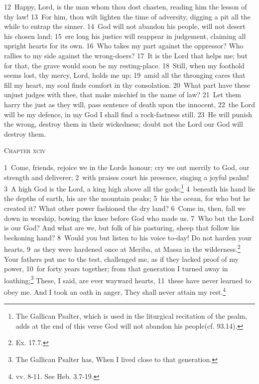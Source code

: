 \documentclass[10pt]{book} %
\begin{document}
\textcolor{benred8}{12}~Happy, Lord, is the man whom thou dost chasten, reading him the lesson of thy law! \textcolor{benred8}{13}~For him, thou wilt lighten the time of adversity, digging a pit all the while to entrap the sinner. \textcolor{benred8}{14}~God will not abandon his people, will not desert his chosen land; \textcolor{benred8}{15}~ere long his justice will reappear in judgement, claiming all upright hearts for its own. \textcolor{benred8}{16}~Who takes my part against the oppressor? Who rallies to my side against the wrong-doers? \textcolor{benred8}{17}~It is the Lord that helps me; but for that, the grave would soon be my resting-place. \textcolor{benred8}{18}~Still, when my foothold seems lost, thy mercy, Lord, holds me up; \textcolor{benred8}{19}~amid all the thronging cares that fill my heart, my soul finds comfort in thy consolation. \textcolor{benred8}{20}~What part have these unjust judges with thee, that make mischief in the name of law? \textcolor{benred8}{21}~Let them harry the just as they will, pass sentence of death upon the innocent, \textcolor{benred8}{22}~the Lord will be my defence, in my God I shall find a rock-fastness still. \textcolor{benred8}{23}~He will punish the wrong, destroy them in their wickedness; doubt not the Lord our God will destroy them.
\begin{large}\begin{center}\textsc{Chapter xciv}\end{center}\end{large}
\textcolor{benred8}{1}~Come, friends, rejoice we in the Lord\textquotesingle s honour; cry we out merrily to God, our strength and deliverer; \textcolor{benred8}{2}~with praises court his presence, singing a joyful psalm! \textcolor{benred8}{3}~A high God is the Lord, a king high above all the gods;\footnote[1]{The Gallican Psalter, which is used in the liturgical recitation of the psalm, adds at the end of this verse \textasciigrave God will not abandon his people\textquotesingle  (cf. 93.14).} \textcolor{benred8}{4}~beneath his hand lie the depths of earth, his are the mountain peaks; \textcolor{benred8}{5}~his the ocean, for who but he created it? What other power fashioned the dry land? \textcolor{benred8}{6}~Come in, then, fall we down in worship, bowing the knee before God who made us. \textcolor{benred8}{7}~Who but the Lord is our God? And what are we, but folk of his pasturing, sheep that follow his beckoning hand?
\textcolor{benred8}{8}~Would you but listen to his voice to-day! Do not harden your hearts, \textcolor{benred8}{9}~as they were hardened once at Meriba, at Massa in the wilderness.\footnote[2]{Ex. 17.7.} Your fathers put me to the test, challenged me, as if they lacked proof of my power, \textcolor{benred8}{10}~for forty years together; from that generation I turned away in loathing;\footnote[3]{The Gallican Psalter has, \textasciigrave When I lived close to that generation\textquotesingle .} These, I said, are ever wayward hearts, \textcolor{benred8}{11}~these have never learned to obey me. And I took an oath in anger, They shall never attain my rest.\footnote[4]{vv. 8-11. See Heb. 3.7-19.}
\end{document}
